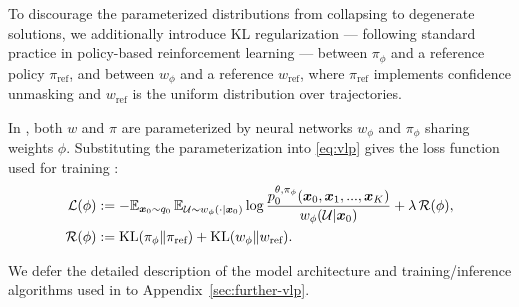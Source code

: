 To discourage the parameterized distributions from collapsing to degenerate solutions, we additionally introduce KL regularization --- following standard practice in policy-based reinforcement learning \citep{schulman2017proximal} --- between $\pi_\phi$ and a reference policy $\pi_\text{ref}$, and between $w_\phi$ and a reference $w_\text{ref}$, where $\pi_\text{ref}$ implements confidence unmasking and $w_\text{ref}$ is the uniform distribution over trajectories.

In \alg{}, both $w$ and $\pi$ are parameterized by neural networks $w_\phi$ and $\pi_\phi$ sharing weights $\phi$. Substituting the parameterization into \eqref{eq:vlp} gives the loss function used for training \alg{}:
\begin{align*}
    \mathcal L(\phi) &:= -\mathbb{E}_{\bm x_0\sim q_0}\, \mathbb{E}_{\mathcal U\sim w_\phi(\cdot|\bm x_0)}\log\frac{p_0^{\theta,\pi_\phi}(\bm x_0, \bm x_1, ..., \bm x_K)}{w_\phi(\mathcal U|\bm x_0)} + \lambda\, \mathcal R(\phi),\\
    \mathcal R(\phi) &:= \mathrm{KL}(\pi_\phi\|\pi_\text{ref}) + \mathrm{KL}(w_\phi\|w_\text{ref}).
\end{align*}

We defer the detailed description of the model architecture and training/inference algorithms used in \alg{} to Appendix~\ref{sec:further-vlp}. 